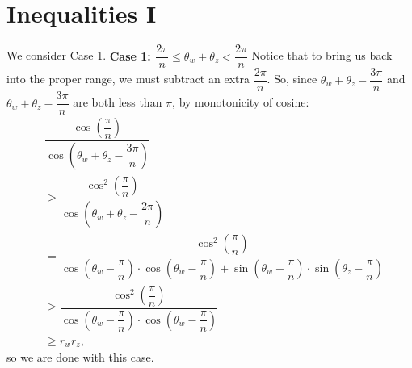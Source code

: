\documentclass{article}
\begin{document}
\section{Inequalities I}
We consider Case 1. \newline
\textbf{Case 1: $\dfrac{2 \pi}{n} \le \theta_w + \theta_z < \dfrac{2 \pi}{n}$} \newline
Notice that to bring us back into the proper range, we must subtract an extra $\dfrac{2 \pi}{n}$. \newline
So, since $\theta_w + \theta_z - \dfrac{3 \pi}{n}$ and 
$\theta_w + \theta_z - \dfrac{3 \pi}{n}$ are both less than $\pi$, by monotonicity of cosine:
\begin{align}
    & \dfrac
    {\cos \left(\dfrac{\pi}{n}\right)}
    {\cos \left( \theta_w + \theta_z - \dfrac{3 \pi}{n}\right)} \\
    &\ge \dfrac
    {\cos^2 \left(\dfrac{\pi}{n}\right)}
    {\cos \left( \theta_w + \theta_z - \dfrac{2 \pi}{n}\right)} \\
    &= \dfrac
    {\cos^2 \left(\dfrac{\pi}{n}\right)}
    {\cos \left( \theta_w - \dfrac{\pi}{n}\right) \cdot \cos \left( \theta_w - \dfrac{\pi}{n}\right)
    + \sin \left( \theta_w - \dfrac{\pi}{n}\right) \cdot \sin \left( \theta_z - \dfrac{\pi}{n}\right)} \\
    &\ge \dfrac
    {\cos^2 \left(\dfrac{\pi}{n}\right)}
    {\cos \left( \theta_w - \dfrac{\pi}{n}\right) \cdot \cos \left( \theta_w - \dfrac{\pi}{n}\right)} \\
    &\ge r_w r_z,
\end{align}
so we are done with this case. $\boxed{\text{ }}$
\newpage
\end{document}
